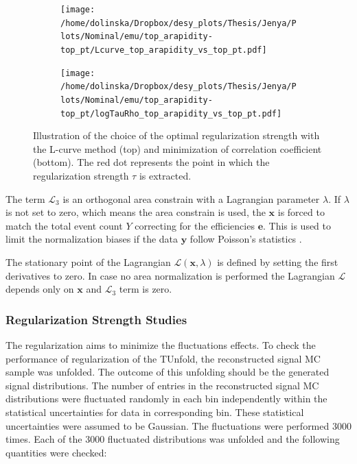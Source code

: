 \begin{figure}[p]
\centering
\begin{subfigure}
  \centering
  \texttt{[image: /home/dolinska/Dropbox/desy\_plots/Thesis/Jenya/Plots/Nominal/emu/top\_arapidity-top\_pt/Lcurve\_top\_arapidity\_vs\_top\_pt.pdf]}
\end{subfigure}
\begin{subfigure}
  \centering
  \texttt{[image: /home/dolinska/Dropbox/desy\_plots/Thesis/Jenya/Plots/Nominal/emu/top\_arapidity-top\_pt/logTauRho\_top\_arapidity\_vs\_top\_pt.pdf]}
\end{subfigure}
\caption{Illustration of the choice of the optimal regularization strength with the L-curve method (top) and minimization of correlation coefficient
         (bottom). The red dot represents the point in which the regularization strength $\tau$ is extracted.}
\label{fig:reg_s_m}
\end{figure}

The term $\mathcal{L}_{3}$ is an orthogonal area constrain with a Lagrangian parameter $\lambda$. If $\lambda$ is not set to zero,
which means the area constrain is used, the $\mathbf{x}$ is forced to match the total event count $Y$ correcting for the efficiencies $\mathbf{e}$.
This is used to limit the normalization biases if the data $\mathbf{y}$ follow Poisson's statistics \cite{Cowan98}.

The stationary point of the Lagrangian $\mathcal{L}(\mathbf{x}, \lambda)$ is defined by setting the first derivatives to zero. In case no 
area normalization is performed the Lagrangian $\mathcal{L}$ depends only on $\mathbf{x}$ and $\mathcal{L}_{3}$ term is zero.

\subsubsection{Regularization Strength Studies}

The regularization aims to minimize the fluctuations effects. To check the performance of regularization of the TUnfold, the reconstructed signal
MC sample was unfolded. The outcome of this unfolding should be the generated signal distributions. The number of entries in the reconstructed signal
MC distributions were fluctuated randomly in each bin independently within the statistical uncertainties for data in corresponding bin. 
These statistical uncertainties were assumed to be Gaussian. The fluctuations were performed 3000 times. Each of the 3000 fluctuated distributions 
was unfolded and the following quantities were checked:

